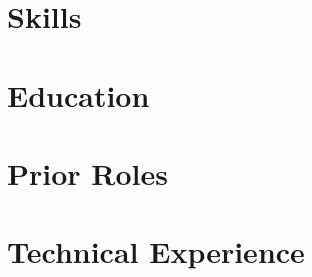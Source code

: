 \documentclass[letter,10pt]{article}
\begin{document}


\section{Skills}


\section{Education}


\section{Prior Roles}


\section{Technical Experience}





% 
\end{document}
